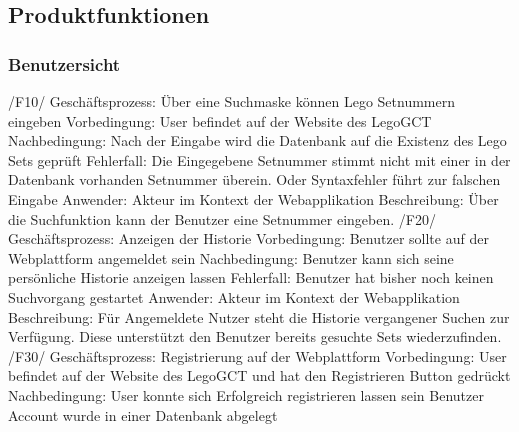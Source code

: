 \subsection{Produktfunktionen}

\subsubsection{Benutzersicht}
/F10/\newline
Geschäftsprozess: Über eine Suchmaske können Lego Setnummern eingeben\newline
Vorbedingung: User befindet auf der Website des LegoGCT\newline
Nachbedingung: Nach der Eingabe wird die Datenbank auf die Existenz des Lego Sets geprüft\newline
Fehlerfall: Die Eingegebene Setnummer stimmt nicht mit einer in der Datenbank vorhanden Setnummer überein. Oder Syntaxfehler führt zur falschen Eingabe\newline
Anwender: Akteur im Kontext der Webapplikation\newline
Beschreibung: Über die Suchfunktion kann der Benutzer eine Setnummer eingeben.\newline\newline
/F20/\newline
Geschäftsprozess: Anzeigen der Historie\newline
Vorbedingung: Benutzer sollte auf der Webplattform angemeldet sein\newline
Nachbedingung: Benutzer kann sich seine persönliche Historie anzeigen lassen\newline
Fehlerfall: Benutzer hat bisher noch keinen Suchvorgang gestartet\newline
Anwender: Akteur im Kontext der Webapplikation\newline
Beschreibung: Für Angemeldete Nutzer steht die Historie vergangener Suchen zur Verfügung. Diese unterstützt den Benutzer bereits gesuchte Sets wiederzufinden.\newline\newline
/F30/\newline
Geschäftsprozess: Registrierung auf der Webplattform\newline
Vorbedingung: User befindet auf der Website des LegoGCT und hat den Registrieren Button gedrückt\newline
Nachbedingung: User konnte sich Erfolgreich registrieren lassen sein Benutzer Account wurde in einer Datenbank abgelegt\newline
